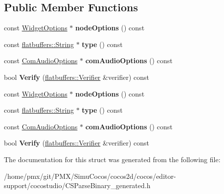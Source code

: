 \subsection*{Public Member Functions}
\begin{DoxyCompactItemize}
\item 
\mbox{\label{structflatbuffers_1_1ComponentOptions_ae7026fe173a6ac1e5d59662e770297be}} 
const \hyperlink{structflatbuffers_1_1WidgetOptions}{Widget\+Options} $\ast$ {\bfseries node\+Options} () const
\item 
\mbox{\label{structflatbuffers_1_1ComponentOptions_aa7502322c66553118e3b3bf2a36c11f9}} 
const \hyperlink{structflatbuffers_1_1String}{flatbuffers\+::\+String} $\ast$ {\bfseries type} () const
\item 
\mbox{\label{structflatbuffers_1_1ComponentOptions_a3d2a35c250924a880d2175b77400a98e}} 
const \hyperlink{structflatbuffers_1_1ComAudioOptions}{Com\+Audio\+Options} $\ast$ {\bfseries com\+Audio\+Options} () const
\item 
\mbox{\label{structflatbuffers_1_1ComponentOptions_a326b0f86145db6d52402525f63e86d7a}} 
bool {\bfseries Verify} (\hyperlink{classflatbuffers_1_1Verifier}{flatbuffers\+::\+Verifier} \&verifier) const
\item 
\mbox{\label{structflatbuffers_1_1ComponentOptions_ae7026fe173a6ac1e5d59662e770297be}} 
const \hyperlink{structflatbuffers_1_1WidgetOptions}{Widget\+Options} $\ast$ {\bfseries node\+Options} () const
\item 
\mbox{\label{structflatbuffers_1_1ComponentOptions_aa7502322c66553118e3b3bf2a36c11f9}} 
const \hyperlink{structflatbuffers_1_1String}{flatbuffers\+::\+String} $\ast$ {\bfseries type} () const
\item 
\mbox{\label{structflatbuffers_1_1ComponentOptions_a3d2a35c250924a880d2175b77400a98e}} 
const \hyperlink{structflatbuffers_1_1ComAudioOptions}{Com\+Audio\+Options} $\ast$ {\bfseries com\+Audio\+Options} () const
\item 
\mbox{\label{structflatbuffers_1_1ComponentOptions_a326b0f86145db6d52402525f63e86d7a}} 
bool {\bfseries Verify} (\hyperlink{classflatbuffers_1_1Verifier}{flatbuffers\+::\+Verifier} \&verifier) const
\end{DoxyCompactItemize}


The documentation for this struct was generated from the following file\+:\begin{DoxyCompactItemize}
\item 
/home/pmx/git/\+P\+M\+X/\+Simu\+Cocos/cocos2d/cocos/editor-\/support/cocostudio/C\+S\+Parse\+Binary\+\_\+generated.\+h\end{DoxyCompactItemize}
